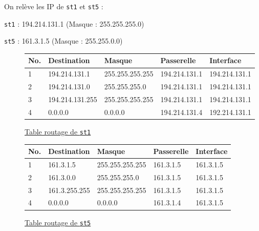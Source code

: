 \documentclass[11pt]{book}
\begin{document}
	On relève les IP de \texttt{st1} et \texttt{st5} :
	\begin{items}{-15pt}{-15pt}
		\item \texttt{st1} : 194.214.131.1 (Masque : 255.255.255.0)
		\item \texttt{st5} : 161.3.1.5 (Masque : 255.255.0.0)
	\end{items}
	
	\begin{figure}[ht!]
		\centering
		\begin{tabular}{|l|l|l|l|l|}
			\hline
			No. & Destination & Masque & Passerelle & Interface \\
			\hline
			1 & 194.214.131.1 & 255.255.255.255 & 194.214.131.1 & 194.214.131.1\\
			\hline
			2 & 194.214.131.0 & 255.255.255.0 & 194.214.131.1 & 194.214.131.1\\
			\hline
			3 & 194.214.131.255 & 255.255.255.255 & 194.214.131.1 & 194.214.131.1\\
			\hline
			4 & 0.0.0.0 & 0.0.0.0 & 194.214.131.4 & 192.214.131.1\\
			\hline
			
		\end{tabular}
		\caption{\ul{Table routage de \texttt{st1}}}
	\end{figure}
	
	\begin{figure}[ht!]
		\centering
		\begin{tabular}{|l|l|l|l|l|}
			\hline
			No. & Destination & Masque & Passerelle & Interface \\
			\hline
			1 & 161.3.1.5 & 255.255.255.255 & 161.3.1.5 & 161.3.1.5\\
			\hline
			2 & 161.3.0.0 & 255.255.255.0 & 161.3.1.5 & 161.3.1.5\\
			\hline
			3 & 161.3.255.255 & 255.255.255.255 & 161.3.1.5 & 161.3.1.5\\
			\hline
			4 & 0.0.0.0 & 0.0.0.0 & 161.3.1.4 & 161.3.1.5\\
			\hline
			
		\end{tabular}
		\caption{\ul{Table routage de \texttt{st5}}}
	\end{figure}
	
\end{document}
